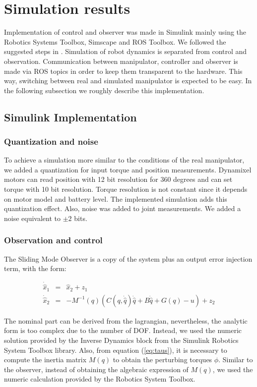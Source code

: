 \documentclass[conference,letterpaper]{ieeeconf}
\begin{document}
\section{Simulation results}
\label{sec:Results}

Implementation of control and observer was made in Simulink mainly using the Robotics Systems Toolbox, Simscape and ROS Toolbox. We followed the suggested steps in \cite{matlab_designing, matlab_trajectory}. Simulation of robot dynamics is separated from control and observation. Communication between manipulator, controller and observer is made via ROS topics in order to keep them transparent to the hardware. This way, switching between real and simulated manipulator is expected to be easy. In the following subsection we roughly describe this implementation.

\subsection{Simulink Implementation}
\subsubsection*{Quantization and noise}
To achieve a simulation more similar to the conditions of the real manipulator, we added a quantization for input torque and position measurements. Dynamixel motors can read position with 12 bit resolution for 360 degrees and can set torque with 10 bit resolution. Torque resolution is not constant since it depends on motor model and battery level. The implemented simulation adds this quantization effect. Also, noise was added to joint measurements. We added a noise equivalent to $\pm 2$ bits. 

\subsubsection*{Observation and control}
The Sliding Mode Observer is a copy of the system plus an output error injection term, with the form:

\begin{eqnarray}
  \dot{\hat{x}}_1 &=& \hat{x}_2 + z_1\label{eq:observer1}\\
  \dot{\hat{x}}_2 &=& -M^{-1}(q)\left(C(q, \dot{\hat{q}})\dot{\hat{q}} + B\dot{\hat{q}} + G(q) - u\right) + z_2\label{eq:observer2}
\end{eqnarray}

  The nominal part can be derived from the lagrangian, nevertheless, the analytic form is too complex due to the number of DOF. Instead, we used the numeric solution provided by the Inverse Dynamics block from the Simulink Robotics System Toolbox library. Also, from equation (\ref{eq:taus}), it is necessary to compute the inertia matrix $M(q)$ to obtain the perturbing torques $\phi$. Similar to the observer, instead of obtaining the algebraic expression of $M(q)$, we used the numeric calculation provided by the Robotics System Toolbox.
  
\end{document}
